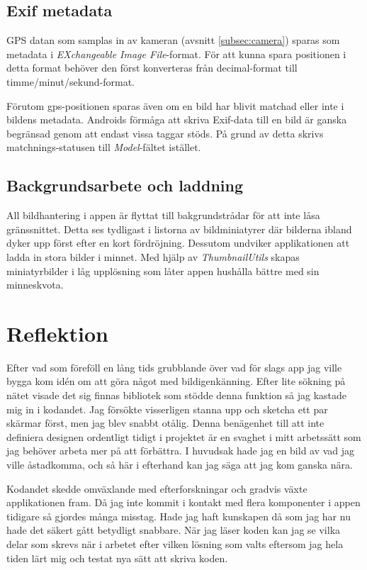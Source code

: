 \documentclass[11px, a4paper, twocolumn]{article}
\begin{document}
\subsection{Exif metadata}
	GPS datan som samplas in av kameran (avsnitt \ref{subsec:camera}) sparas som metadata i \emph{EXchangeable Image File}-format. För att kunna spara positionen i detta format behöver den först konverteras från decimal-format till timme/minut/sekund-format.

	Förutom gps-positionen sparas även om en bild har blivit matchad eller inte i bildens metadata. Androids förmåga att skriva Exif-data till en bild är ganska begränsad genom att endast vissa taggar stöds. På grund av detta skrivs matchnings-statusen till \emph{Model}-fältet istället.

\subsection{Backgrundsarbete och laddning}
	All bildhantering i appen är flyttat till bakgrundstrådar för att inte låsa gränssnittet\cite{BitmapProcessing}. Detta ses tydligast i listorna av bildminiatyrer där bilderna ibland dyker upp först efter en kort fördröjning. Dessutom undviker applikationen att ladda in stora bilder i minnet. Med hjälp av \emph{ThumbnailUtils} skapas miniatyrbilder i låg upplösning som låter appen hushålla bättre med sin minneskvota.



\section{Reflektion}
	Efter vad som föreföll en lång tids grubblande över vad för slags app jag ville bygga kom idén om att göra något med bildigenkänning. Efter lite sökning på nätet visade det sig finnas bibliotek som stödde denna funktion så jag kastade mig in i kodandet. Jag försökte visserligen stanna upp och sketcha ett par skärmar först, men jag blev snabbt otålig. Denna benägenhet till att inte definiera designen ordentligt tidigt i projektet är en svaghet i mitt arbetssätt som jag behöver arbeta mer på att förbättra. I huvudsak hade jag en bild av vad jag ville åstadkomma, och så här i efterhand kan jag säga att jag kom ganska nära.

	Kodandet skedde omväxlande med efterforskningar och gradvis växte applikationen fram. Då jag inte kommit i kontakt med flera komponenter i appen tidigare så gjordes många misstag. Hade jag haft kunskapen då som jag har nu hade det säkert gått betydligt snabbare. När jag läser koden kan jag se vilka delar som skrevs när i arbetet efter vilken lösning som valts eftersom jag hela tiden lärt mig och testat nya sätt att skriva koden.
\end{document}
